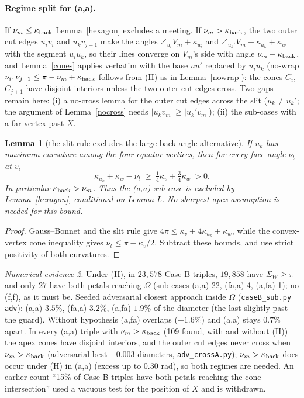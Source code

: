 \documentclass[11pt]{article}
\newtheorem{lemma}{Lemma}
\theoremstyle{definition}
\theoremstyle{remark}
\newtheorem{numerics}[lemma]{Numerical evidence}
\begin{document}
\paragraph{Regime split for (a,a).} If $\nu_m\le\kappa_{\rm back}$ Lemma~\ref{hexagon} excludes a meeting.
If $\nu_m>\kappa_{\rm back}$, the two outer cut edges $u_iv_i$ and $u_kv_{j+1}$ make the angles
$\angle_{u_i}V_m+\kappa_{u_i}$ and $\angle_{u_k'}V_m+\kappa_{u_k}+\kappa_w$ with the segment $u_iu_k$, so their lines
converge on $V_m$'s side with angle $\nu_m-\kappa_{\rm back}$, and Lemma~\ref{cones} applies verbatim with the
base $uu'$ replaced by $u_iu_k$ (no-wrap $\nu_i,\nu_{j+1}\le\pi-\nu_m+\kappa_{\rm back}$ follows from (H) as in
Lemma~\ref{nowrap}): the cones $C_i$, $C_{j+1}$ have disjoint interiors unless the two outer cut edges cross.
Two gaps remain here: (i) a no-cross lemma for the outer cut edges across the slit ($u_k\ne u_k'$; the argument of
Lemma~\ref{nocross} needs $|u_kv_m|\ge|u_k'v_m|$); (ii) the sub-cases with a far vertex past $X$.

\begin{lemma}[the slit rule excludes the large-back-angle alternative]\label{backbound}
If $u_k$ has maximum curvature among the four equator vertices, then for
every face angle $\nu_t$ at $v$,
\[
 \kappa_{u_k}+\kappa_w-\nu_t
 \ \ge\ \tfrac14\kappa_v+\tfrac34\kappa_w\ >0.
\]
In particular $\kappa_{\rm back}>\nu_m$. Thus the (a,a) sub-case is excluded
by Lemma~\ref{hexagon}, conditional on Lemma L. No sharpest-apex assumption
is needed for this bound.
\end{lemma}
\begin{proof}
Gauss--Bonnet and the slit rule give
$4\pi\le\kappa_v+4\kappa_{u_k}+\kappa_w$, while the convex-vertex cone
inequality gives $\nu_t\le\pi-\kappa_v/2$. Subtract these bounds, and use
strict positivity of both curvatures.
\end{proof}

\begin{numerics}
Under (H), in $23{,}578$ Case-B triples, $19{,}858$ have $\Sigma_W\ge\pi$ and only $27$ have both petals reaching
$\Omega$ (sub-cases (a,a) 22, (fa,a) 4, (a,fa) 1); no (f,f), as it must be. Seeded adversarial closest approach inside
$\Omega$ (\texttt{caseB\_sub.py adv}): (a,a) $3.5\%$, (fa,a) $3.2\%$, (a,fa) $1.9\%$ of the diameter (the last slightly
past the guard). Without hypothesis (a,fa) overlaps ($+1.6\%$) and (a,a) stays $0.7\%$ apart. In every (a,a) triple with
$\nu_m>\kappa_{\rm back}$ (109 found, with and without (H)) the apex cones have disjoint interiors, and the outer cut
edges never cross when $\nu_m>\kappa_{\rm back}$ (adversarial best $-0.003$ diameters, \texttt{adv\_crossA.py});
$\nu_m>\kappa_{\rm back}$ does occur under (H) in (a,a) (excess up to $0.30$ rad), so both regimes are needed.
An earlier count ``15\% of Case-B triples have both petals reaching the cone intersection'' used a vacuous test
for the position of $X$ and is withdrawn.
\end{numerics}
\end{document}
